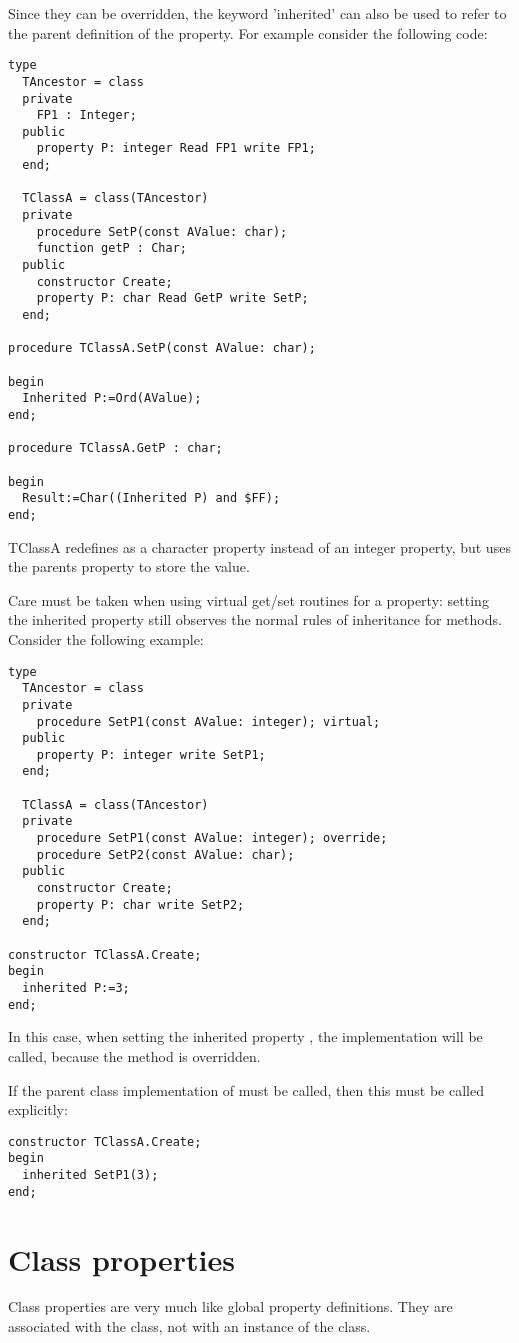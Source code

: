 Since they can be overridden, the keyword 'inherited'  can
also be used to refer to the parent definition of the property. For example
consider the following code:
\begin{verbatim}
type
  TAncestor = class
  private
    FP1 : Integer;
  public
    property P: integer Read FP1 write FP1;
  end;
 
  TClassA = class(TAncestor)
  private
    procedure SetP(const AValue: char);
    function getP : Char;
  public
    constructor Create;
    property P: char Read GetP write SetP;
  end;

procedure TClassA.SetP(const AValue: char);

begin
  Inherited P:=Ord(AValue);
end;

procedure TClassA.GetP : char;

begin
  Result:=Char((Inherited P) and $FF);
end;
\end{verbatim}
TClassA redefines  as a character property instead of an integer
property, but uses the parents  property to store the value.

Care must be taken when using virtual get/set routines for a property:
setting the inherited property still observes the normal rules of inheritance
for methods. Consider the following example:
\begin{verbatim}
type
  TAncestor = class
  private
    procedure SetP1(const AValue: integer); virtual;
  public
    property P: integer write SetP1;
  end;

  TClassA = class(TAncestor)
  private
    procedure SetP1(const AValue: integer); override;
    procedure SetP2(const AValue: char);
  public
    constructor Create;
    property P: char write SetP2;
  end;

constructor TClassA.Create;
begin
  inherited P:=3; 
end;
\end{verbatim}
In this case, when setting the inherited property , the
implementation  will be called, because the
 method is overridden.

If the parent class implementation of  must be called,
then this must be called explicitly:
\begin{verbatim}
constructor TClassA.Create;
begin
  inherited SetP1(3);
end;
\end{verbatim}

\section{Class properties}
Class properties are very much like global property definitions. They are
associated with the class, not with an instance of the class. 

